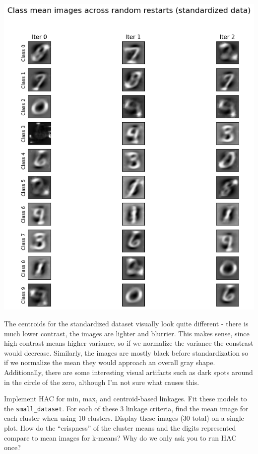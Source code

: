 \documentclass[expanded]{lkx_pset}
\begin{document}
\begin{parts}
	\begin{center}
		\includegraphics[scale=0.7]{figures/kmeans-class_means_std.png}
	\end{center}

	The centroids for the standardized dataset visually look quite different - there is much lower contrast, the images are lighter and blurrier. This makes sense, since high contrast means higher variance, so if we normalize the variance the constrast would decrease. Similarly, the images are mostly black before standardization so if we normalize the mean they would approach an overall gray shape. Additionally, there are some interesting visual artifacts such as dark spots around in the circle of the zero, although I'm not sure what causes this.

	\pagebreak
	\begin{part}{4} Implement HAC for min, max, and centroid-based linkages. Fit
		these models to the \texttt{small\_dataset}.  For each of these 3
		linkage criteria, find the mean image for each cluster when using $10$ clusters. Display these images (30 total) on a single plot. How do the ``crispness'' of the cluster means and the digits
		represented compare to mean images for k-means?
		Why do we only ask you to run HAC once?
	\end{part}


\end{parts}
\end{document}
